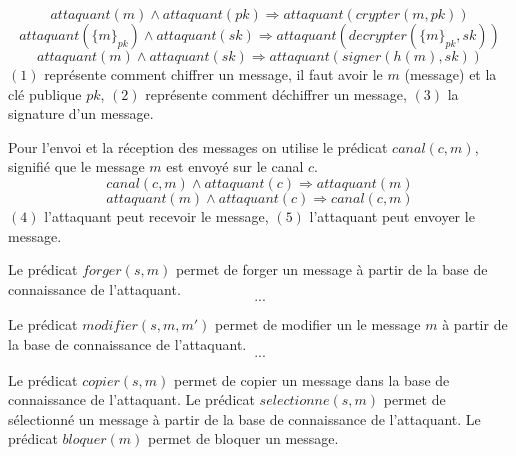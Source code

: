 \documentclass[10pt,a4paper]{article}
\begin{document}
\begin{equation}
attaquant(m)\wedge attaquant(pk)\Longrightarrow attaquant(crypter(m,pk))
\end{equation}
\begin{equation}
attaquant({\lbrace m \rbrace}_{pk}) \wedge attaquant(sk)\Longrightarrow attaquant(decrypter({\lbrace m \rbrace}_{pk},sk)) 
\end{equation}
\begin{equation}
attaquant(m)\wedge attaquant(sk)\Longrightarrow attaquant(signer(h(m),sk))
\end{equation}
$(1)$ représente comment chiffrer un message, il faut avoir le $m$ (message) et la clé publique $pk$, $(2)$ représente comment déchiffrer un message, $(3)$ la signature d'un message.\newline

Pour l'envoi et la réception des messages on utilise le prédicat $canal(c,m)$, signifié que le message $m$ est envoyé sur le canal $c$.  
\begin{equation}
canal(c,m)\wedge attaquant(c)\Longrightarrow attaquant(m)
\end{equation}
\begin{equation}
attaquant(m)\wedge attaquant(c)\Longrightarrow canal(c,m) 
\end{equation}
$(4)$ l'attaquant peut recevoir le message, $(5)$ l'attaquant peut envoyer le message.\newline

Le prédicat $forger(s,m)$ permet de forger un message à partir de la base de connaissance de l'attaquant.
\begin{equation}
...
\end{equation}

Le prédicat $modifier(s,m,m')$ permet de modifier un le message $m$ à partir de la base de connaissance de l'attaquant.\newline
\begin{equation}
...
\end{equation}

Le prédicat $copier(s,m)$ permet de copier un message dans la base de connaissance de l'attaquant. Le prédicat $selectionne(s,m)$ permet de sélectionné un message à partir de la base de connaissance de l'attaquant. Le prédicat $bloquer(m)$ permet de bloquer un message.
\end{document}
